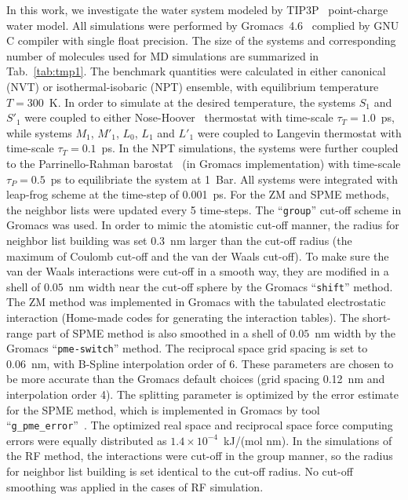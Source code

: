\documentclass[aip,jcp,a4paper,preprint,unsortedaddress,onecolumn,fleqn]{revtex4-1}
\newcommand{\systemsb}{S_1}
\newcommand{\systemsbp}{S'_1}
\newcommand{\systemmb}{M_1}
\newcommand{\systemmbp}{M'_1}
\newcommand{\systemla}{L_0}
\newcommand{\systemlbp}{L'_1}
\newcommand{\systemlb}{L_1}
\begin{document}
In this work, we investigate the water system modeled by
TIP3P~\cite{jorgensen1983comparison} point-charge water model.
All simulations were performed by Gromacs~4.6~\cite{hess2008gromacs, pronk2013gromacs} complied by GNU C compiler with single float precision.
The size of the systems and corresponding number of molecules used for MD simulations are summarized in Tab.~\ref{tab:tmp1}.
The benchmark quantities were calculated in either  canonical (NVT) or isothermal-isobaric (NPT) ensemble, with equilibrium temperature $T=300$~K.
In order to simulate at the desired temperature,
the systems $\systemsb$ and $\systemsbp$ were coupled to either Nose-Hoover~\cite{nose1984molecular,hoover1985canonical} thermostat with time-scale $\tau_T = 1.0$~ps,
while systems $\systemmb$, $\systemmbp$, $\systemla$, $\systemlb$ and $\systemlbp$ were coupled to Langevin thermostat with time-scale $\tau_T = 0.1$~ps.
In the NPT simulations, the systems were further coupled
to the Parrinello-Rahman barostat~\cite{parrinello1980crystal,parrinello1981polymorphic} (in Gromacs implementation)
with time-scale $\tau_P = 0.5$~ps to equilibriate the system at 1~Bar.
All systems were integrated with leap-frog scheme at the time-step of 0.001~ps.
For the ZM and SPME methods,
the neighbor lists were updated every 5 time-steps.
The ``\texttt{group}'' cut-off scheme in Gromacs was used. In order to mimic the atomistic
cut-off manner, the radius for neighbor list building was set 0.3~nm
larger than the cut-off radius (the maximum of Coulomb cut-off and the van der Waals cut-off).
To make sure the van der Waals interactions were cut-off in a smooth way,
they are modified in a shell of $0.05$~nm width near the cut-off sphere by the Gromacs ``\texttt{shift}'' method.
The ZM method was implemented in Gromacs with the tabulated electrostatic interaction (Home-made codes for generating the interaction tables).
The short-range part of SPME method is also smoothed in a shell of $0.05$~nm width  by the Gromacs ``\texttt{pme-switch}'' method.
The reciprocal space
grid spacing is set to 0.06~nm, with B-Spline interpolation order of 6.
These parameters are chosen to be more accurate than the Gromacs default choices (grid spacing 0.12~nm and interpolation order 4).
The splitting parameter is optimized by the error estimate for the SPME method, which is implemented in Gromacs by tool ``\texttt{g\_pme\_error}''~\cite{wang2010optimizing}.
The optimized real space and reciprocal space force computing errors were equally distributed as $1.4\times10^{-4}$~kJ/(mol nm).
In the simulations of the RF method, the interactions were cut-off in the group manner,
so the radius for neighbor list building is set identical to the cut-off radius.
No cut-off smoothing was applied in the cases of RF simulation.
\end{document}
